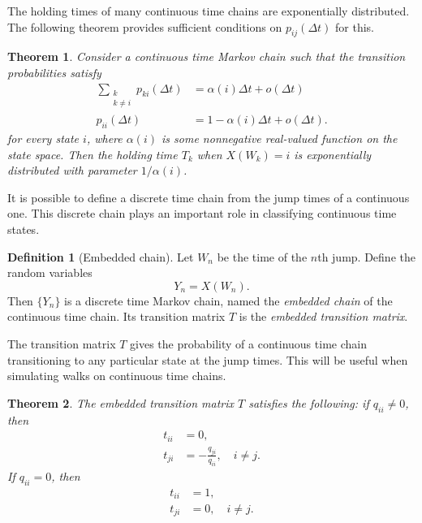 \documentclass[12pt]{article}
\newtheorem{thm}{Theorem}[section]
\theoremstyle{definition}
\newtheorem{defn}{Definition}
\begin{document}
The holding times of many continuous time chains are exponentially distributed.
The following theorem provides sufficient conditions on $p_{ij}(\Delta t)$ for
this.

\begin{thm}
    \label{thm:general-holding-times}
    Consider a continuous time Markov chain such that the transition
    probabilities satisfy
    \begin{align*}
    \sum_{\substack{k \\ k \neq i}} p_{ki}(\Delta t) &=
        \alpha(i) \Delta t + o(\Delta t) \\
%
        p_{ii}(\Delta t) &= 1 - \alpha(i) \Delta t + o(\Delta t).
    \end{align*}
    for every state $i$, where $\alpha(i)$ is some nonnegative real-valued
    function on the state space. Then the holding time $T_k$ when $X(W_k) = i$
    is exponentially distributed with parameter $1/\alpha(i)$.
\end{thm}

It is possible to define a discrete time chain from the jump times of a
continuous one. This discrete chain plays an important role in classifying
continuous time states.

\begin{defn}[Embedded chain]
    \label{defn:embedded-chain}
    Let $W_n$ be the time of the $n$th jump. Define the random variables $$Y_n
    = X(W_n).$$ Then $\{Y_n\}$ is a discrete time Markov chain, named the
    \emph{embedded chain} of the continuous time chain. Its transition matrix
    $T$ is the \emph{embedded transition matrix}.
\end{defn}

The transition matrix $T$ gives the probability of a continuous time chain
transitioning to any particular state at the jump times. This will be useful
when simulating walks on continuous time chains.

\begin{thm}
    \label{thm:embedded-transition-matrix}
    The embedded transition matrix $T$ satisfies the following: if $q_{ii} \neq
    0$, then
    \begin{align*}
        t_{ii} &= 0, \\
        t_{ji} &= -\frac{q_{ji}}{q_{ii}}, \quad i \neq j.
    \end{align*}
    If $q_{ii} = 0$, then
    \begin{align*}
        t_{ii} &= 1, \\
        t_{ji} &= 0, \quad i \neq j.
    \end{align*}
\end{thm}
\end{document}
